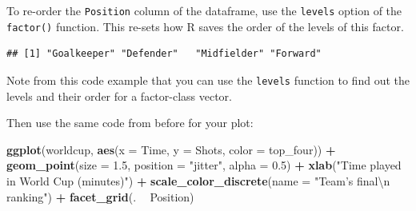 \documentclass[]{book}
\makeatletter
\newenvironment{Shaded}{\begin{snugshade}}{\end{snugshade}}
\newcommand{\KeywordTok}[1]{\textcolor[rgb]{0.13,0.29,0.53}{\textbf{#1}}}
\newcommand{\DataTypeTok}[1]{\textcolor[rgb]{0.13,0.29,0.53}{#1}}
\newcommand{\FloatTok}[1]{\textcolor[rgb]{0.00,0.00,0.81}{#1}}
\newcommand{\CharTok}[1]{\textcolor[rgb]{0.31,0.60,0.02}{#1}}
\newcommand{\StringTok}[1]{\textcolor[rgb]{0.31,0.60,0.02}{#1}}
\newcommand{\OperatorTok}[1]{\textcolor[rgb]{0.81,0.36,0.00}{\textbf{#1}}}
\newcommand{\NormalTok}[1]{#1}
\newenvironment{kframe}{%
\medskip{}
\setlength{\fboxsep}{.8em}
 \def\at@end@of@kframe{}%
 \ifinner\ifhmode%
  \def\at@end@of@kframe{\end{minipage}}%
  \begin{minipage}{\columnwidth}%
 \fi\fi%
 \def\FrameCommand##1{\hskip\@totalleftmargin \hskip-\fboxsep
 \colorbox{shadecolor}{##1}\hskip-\fboxsep
     \hskip-\linewidth \hskip-\@totalleftmargin \hskip\columnwidth}%
 \MakeFramed {\advance\hsize-\width
   \@totalleftmargin\z@ \linewidth\hsize
   \@setminipage}}%
 {\par\unskip\endMakeFramed%
 \at@end@of@kframe}
\renewenvironment{Shaded}{\begin{kframe}}{\end{kframe}}
\newenvironment{rmdblock}[1]
  {
  \begin{itemize}
  \renewcommand{\labelitemi}{
    \raisebox{-.7\height}[0pt][0pt]{
      {\setkeys{Gin}{width=3em,keepaspectratio}\texttt{[image: images/\#1]}}
    }
  }
  \setlength{\fboxsep}{1em}
  \begin{kframe}
  \item
  }
  {
  \end{kframe}
  \end{itemize}
  }
\newenvironment{rmdnote}
  {\begin{rmdblock}{note}}
  {\end{rmdblock}}
\theoremstyle{definition}
\theoremstyle{definition}
\theoremstyle{definition}
\theoremstyle{remark}
\makeatother
\begin{document}
To re-order the \texttt{Position} column of the dataframe, use the
\texttt{levels} option of the \texttt{factor()} function. This re-sets
how R saves the order of the levels of this factor.

\begin{Shaded}
\end{Shaded}

\begin{verbatim}
## [1] "Goalkeeper" "Defender"   "Midfielder" "Forward"
\end{verbatim}

\begin{rmdnote}
Note from this code example that you can use the \texttt{levels}
function to find out the levels and their order for a factor-class
vector.
\end{rmdnote}

Then use the same code from before for your plot:

\begin{Shaded}
\begin{Highlighting}[]
\KeywordTok{ggplot}\NormalTok{(worldcup, }\KeywordTok{aes}\NormalTok{(}\DataTypeTok{x =}\NormalTok{ Time, }\DataTypeTok{y =}\NormalTok{ Shots,}
                     \DataTypeTok{color =}\NormalTok{ top_four)) }\OperatorTok{+}
\StringTok{        }\KeywordTok{geom_point}\NormalTok{(}\DataTypeTok{size =} \FloatTok{1.5}\NormalTok{, }\DataTypeTok{position =} \StringTok{"jitter"}\NormalTok{,}
                   \DataTypeTok{alpha =} \FloatTok{0.5}\NormalTok{)  }\OperatorTok{+}\StringTok{ }
\StringTok{        }\KeywordTok{xlab}\NormalTok{(}\StringTok{"Time played in World Cup (minutes)"}\NormalTok{) }\OperatorTok{+}\StringTok{ }
\StringTok{        }\KeywordTok{scale_color_discrete}\NormalTok{(}\DataTypeTok{name =} \StringTok{"Team's final}\CharTok{\textbackslash{}n}\StringTok{ ranking"}\NormalTok{) }\OperatorTok{+}\StringTok{ }
\StringTok{        }\KeywordTok{facet_grid}\NormalTok{(. }\OperatorTok{~}\StringTok{ }\NormalTok{Position)}
\end{Highlighting}
\end{Shaded}
\end{document}
